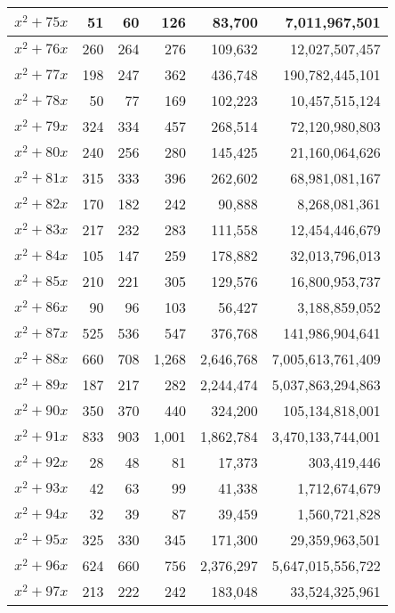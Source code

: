 \documentclass{article}
\begin{document}
\begin{center}
\begin{tabular}{ | c | r | r | r | r | r | }
$x^2 + 75x$ & 51 & 60 & 126 & 83{,}700 & 7{,}011{,}967{,}501 \\ \hline
$x^2 + 76x$ & 260 & 264 & 276 & 109{,}632 & 12{,}027{,}507{,}457 \\ \hline
$x^2 + 77x$ & 198 & 247 & 362 & 436{,}748 & 190{,}782{,}445{,}101 \\ \hline
$x^2 + 78x$ & 50 & 77 & 169 & 102{,}223 & 10{,}457{,}515{,}124 \\ \hline
$x^2 + 79x$ & 324 & 334 & 457 & 268{,}514 & 72{,}120{,}980{,}803 \\ \hline
$x^2 + 80x$ & 240 & 256 & 280 & 145{,}425 & 21{,}160{,}064{,}626 \\ \hline
$x^2 + 81x$ & 315 & 333 & 396 & 262{,}602 & 68{,}981{,}081{,}167 \\ \hline
$x^2 + 82x$ & 170 & 182 & 242 & 90{,}888 & 8{,}268{,}081{,}361 \\ \hline
$x^2 + 83x$ & 217 & 232 & 283 & 111{,}558 & 12{,}454{,}446{,}679 \\ \hline
$x^2 + 84x$ & 105 & 147 & 259 & 178{,}882 & 32{,}013{,}796{,}013 \\ \hline
$x^2 + 85x$ & 210 & 221 & 305 & 129{,}576 & 16{,}800{,}953{,}737 \\ \hline
$x^2 + 86x$ & 90 & 96 & 103 & 56{,}427 & 3{,}188{,}859{,}052 \\ \hline
$x^2 + 87x$ & 525 & 536 & 547 & 376{,}768 & 141{,}986{,}904{,}641 \\ \hline
$x^2 + 88x$ & 660 & 708 & 1{,}268 & 2{,}646{,}768 & 7{,}005{,}613{,}761{,}409 \\ \hline
$x^2 + 89x$ & 187 & 217 & 282 & 2{,}244{,}474 & 5{,}037{,}863{,}294{,}863 \\ \hline
$x^2 + 90x$ & 350 & 370 & 440 & 324{,}200 & 105{,}134{,}818{,}001 \\ \hline
$x^2 + 91x$ & 833 & 903 & 1{,}001 & 1{,}862{,}784 & 3{,}470{,}133{,}744{,}001 \\ \hline
$x^2 + 92x$ & 28 & 48 & 81 & 17{,}373 & 303{,}419{,}446 \\ \hline
$x^2 + 93x$ & 42 & 63 & 99 & 41{,}338 & 1{,}712{,}674{,}679 \\ \hline
$x^2 + 94x$ & 32 & 39 & 87 & 39{,}459 & 1{,}560{,}721{,}828 \\ \hline
$x^2 + 95x$ & 325 & 330 & 345 & 171{,}300 & 29{,}359{,}963{,}501 \\ \hline
$x^2 + 96x$ & 624 & 660 & 756 & 2{,}376{,}297 & 5{,}647{,}015{,}556{,}722 \\ \hline
$x^2 + 97x$ & 213 & 222 & 242 & 183{,}048 & 33{,}524{,}325{,}961 \\ \hline

\end{tabular}
\end{center}
\end{document}

